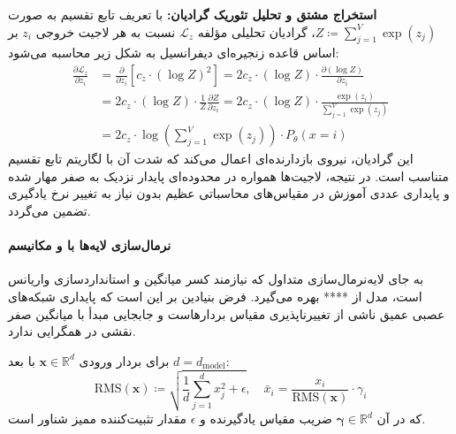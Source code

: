 \textbf{استخراج مشتق و تحلیل تئوریک گرادیان:}
با تعریف تابع تقسیم به صورت $Z \coloneqq \sum_{j=1}^V \exp(z_j)$، گرادیان تحلیلی مؤلفه $\mathcal{L}_z$ نسبت به هر لاجیت خروجی $z_i$ بر اساس قاعده زنجیره‌ای دیفرانسیل به شکل زیر محاسبه می‌شود:
\begin{align}
    \frac{\partial \mathcal{L}_z}{\partial z_i} &= \frac{\partial}{\partial z_i} \left[ c_z \cdot (\log Z)^2 \right] = 2 c_z \cdot (\log Z) \cdot \frac{\partial (\log Z)}{\partial z_i} \nonumber \\
    &= 2 c_z \cdot (\log Z) \cdot \frac{1}{Z} \frac{\partial Z}{\partial z_i} = 2 c_z \cdot (\log Z) \cdot \frac{\exp(z_i)}{\sum_{j=1}^V \exp(z_j)} \nonumber \\
    &= 2 c_z \cdot \log\left(\sum_{j=1}^V \exp(z_j)\right) \cdot P_\theta(x = i)
\end{align}
این گرادیان، نیروی بازدارنده‌ای اعمال می‌کند که شدت آن با لگاریتم تابع تقسیم متناسب است. در نتیجه، لاجیت‌ها همواره در محدوده‌ای پایدار نزدیک به صفر مهار شده و پایداری عددی آموزش در مقیاس‌های محاسباتی عظیم بدون نیاز به تغییر نرخ یادگیری تضمین می‌گردد.

\paragraph*{نرمال‌سازی لایه‌ها با  و مکانیسم }
به جای لایه‌نرمال‌سازی متداول که نیازمند کسر میانگین و استانداردسازی واریانس است، مدل  از **** \cite{zhang2019rmsnorm} بهره می‌گیرد. فرض بنیادین بر این است که پایداری شبکه‌های عصبی عمیق ناشی از تغییرناپذیری مقیاس بردارهاست و جابجایی مبدأ با میانگین صفر نقشی در همگرایی ندارد.

برای بردار ورودی $\mathbf{x} \in \mathbb{R}^d$ با بعد $d = d_{\text{model}}$:
\begin{equation}
    \text{RMS}(\mathbf{x}) \coloneqq \sqrt{\frac{1}{d} \sum_{j=1}^d x_j^2 + \epsilon}, \quad \bar{x}_i = \frac{x_i}{\text{RMS}(\mathbf{x})} \cdot \gamma_i
\end{equation}
که در آن $\boldsymbol{\gamma} \in \mathbb{R}^d$ ضریب مقیاس یادگیرنده و $\epsilon$ مقدار تثبیت‌کننده ممیز شناور است.

